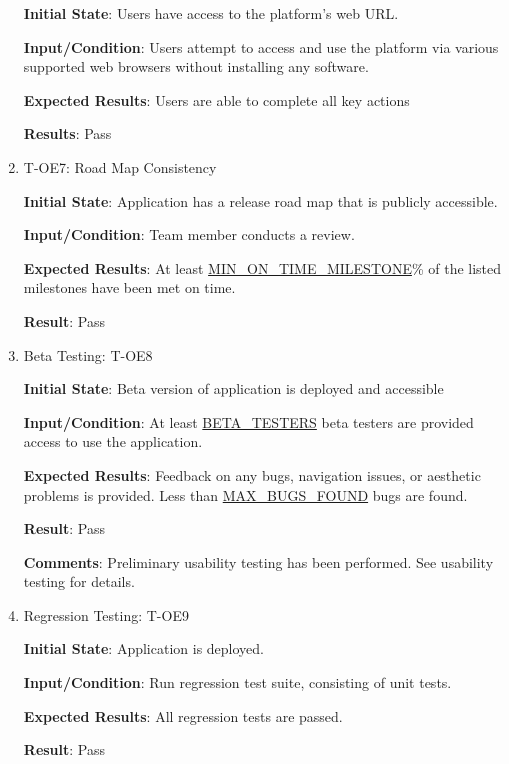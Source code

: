 \documentclass[12pt, titlepage]{article}
\begin{document}
\begin{enumerate}
    \textbf{Initial State}: Users have access to the platform's web URL.
    
    \textbf{Input/Condition}: Users attempt to access and use the platform via various supported web browsers without installing any software.
    
    \textbf{Expected Results}: Users are able to complete all key actions

    \textbf{Results}: Pass
    
    
    \item{T-OE7: Road Map Consistency\\}
                        
    \textbf{Initial State}: Application has a release road map that is publicly accessible.
                        
    \textbf{Input/Condition}: Team member conducts a review.
                        
    \textbf{Expected Results}: At least \hyperref[MIN_ON_TIME_MILESTONE]{MIN\_ON\_TIME\_MILESTONE}\% of the listed milestones have been met on time.
                        
    \textbf{Result}: Pass

    
    \item{Beta Testing: T-OE8\\}
    
                        
    \textbf{Initial State}: Beta version of application is deployed and accessible
                        
    \textbf{Input/Condition}: At least \hyperref[BETA_TESTERS]{BETA\_TESTERS} beta testers are provided access to use the application.
                        
    \textbf{Expected Results}: Feedback on any bugs, navigation issues, or aesthetic problems is provided. Less than \hyperref[MAX_BUGS_FOUND]{MAX\_BUGS\_FOUND} bugs are found.
                        
    \textbf{Result}: Pass

    \textbf{Comments}: Preliminary usability testing has been performed. See usability testing for details.
    
    \item{Regression Testing: T-OE9\\}
    
                        
    \textbf{Initial State}: Application is deployed.
                        
    \textbf{Input/Condition}: Run regression test suite, consisting of unit tests.
                        
    \textbf{Expected Results}: All regression tests are passed.
                        
    \textbf{Result}: Pass

    
    \end{enumerate}
\end{document}
